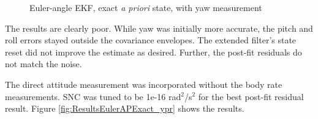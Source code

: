 \documentclass[]{aiaa-tc}%
\begin{document}
\begin{figure}[H]
{		}
		\caption{Euler-angle EKF, exact \textit{a priori} state, with yaw measurement }
		\label{fig:ResultsEulerAPExact_yaw}
	\end{figure}	

The results are clearly poor. While yaw was initially more accurate, the pitch and roll errors stayed outside the covariance envelopes. The extended filter's state reset did not improve the estimate as desired. Further, the post-fit residuals do not match the noise.

	\vspace{5 mm}

The direct attitude measurement was incorporated without the body rate measurements. SNC was tuned to be 1e-16 rad$^2$/s$^2$ for the best post-fit residual result. Figure \ref{fig:ResultsEulerAPExact_ypr} shows the results.
	\begin{figure}[H]
		\centering
\end{figure}
\end{document}
